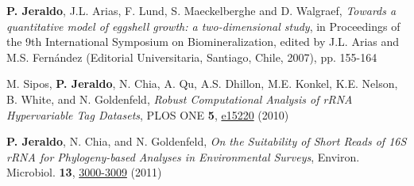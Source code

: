 \documentclass[letterpaper]{article}
\renewenvironment{itemize}{
  \begin{list}{}{
    \setlength{\leftmargin}{1.5em}
  }
}{
  \end{list}
}
\begin{document}
\begin{itemize}
\item \textbf{P. Jeraldo}, J.L. Arias, F. Lund, S. Maeckelberghe and D.
Walgraef, \textit{Towards a quantitative model of eggshell growth: a
two-dimensional study}, in Proceedings of the 9th International Symposium on Biomineralization,
edited by J.L. Arias and M.S. Fernández (Editorial Universitaria, Santiago,
Chile, 2007), pp. 155-164
\item M. Sipos, \textbf{P. Jeraldo}, N. Chia, A. Qu, A.S. Dhillon, M.E. Konkel,
K.E. Nelson, B. White, and N. Goldenfeld,
\textit{Robust Computational Analysis of rRNA Hypervariable Tag Datasets},
PLOS ONE \textbf{5},
\href{http://www.plosone.org/article/info:doi/10.1371/journal.pone.0015220}{e15220} (2010)
\item \textbf{P. Jeraldo}, N. Chia, and N. Goldenfeld, \textit{On the
Suitability of Short Reads of 16S rRNA for Phylogeny-based Analyses in Environmental Surveys},
Environ. Microbiol. \textbf{13},
\href{http://doi.wiley.com/10.1111/j.1462-2920.2011.02577.x}{3000-3009} (2011)


\end{itemize}
\end{document}
